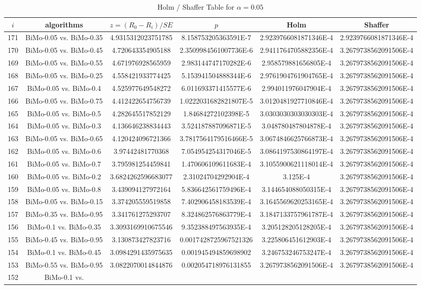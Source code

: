 \documentclass[a4paper,10pt]{article}
\begin{document}
\begin{landscape}
\begin{table}[!htp]
\centering\tiny
\caption{Holm / Shaffer Table for $\alpha=0.05$}
\begin{tabular}{cccccc}
$i$&algorithms&$z=(R_0 - R_i)/SE$&$p$&Holm&Shaffer\\
\hline
171&BiMo-0.05 vs. BiMo-0.35&4.9315312023751785&8.158753205363591E-7&2.9239766081871346E-4&2.9239766081871346E-4\\170&BiMo-0.05 vs. BiMo-0.45&4.720643354905188&2.3509984561007736E-6&2.9411764705882356E-4&3.2679738562091506E-4\\169&BiMo-0.05 vs. BiMo-0.55&4.671976928565959&2.983144747170282E-6&2.958579881656805E-4&3.2679738562091506E-4\\168&BiMo-0.05 vs. BiMo-0.25&4.558421933774425&5.153941504888344E-6&2.9761904761904765E-4&3.2679738562091506E-4\\167&BiMo-0.05 vs. BiMo-0.4&4.525977649548272&6.011693371415577E-6&2.994011976047904E-4&3.2679738562091506E-4\\166&BiMo-0.05 vs. BiMo-0.75&4.412422654756739&1.0222031682821807E-5&3.0120481927710846E-4&3.2679738562091506E-4\\165&BiMo-0.05 vs. BiMo-0.5&4.282645517852129&1.84684272102398E-5&3.0303030303030303E-4&3.2679738562091506E-4\\164&BiMo-0.05 vs. BiMo-0.3&4.136646238834443&3.524187887096871E-5&3.048780487804878E-4&3.2679738562091506E-4\\163&BiMo-0.05 vs. BiMo-0.65&4.120424096721366&3.7817564179516466E-5&3.0674846625766873E-4&3.2679738562091506E-4\\162&BiMo-0.05 vs. BiMo-0.6&3.97442481770368&7.054954254317046E-5&3.0864197530864197E-4&3.2679738562091506E-4\\161&BiMo-0.05 vs. BiMo-0.7&3.795981254459841&1.470606109611683E-4&3.1055900621118014E-4&3.2679738562091506E-4\\160&BiMo-0.05 vs. BiMo-0.2&3.6824262596683077&2.31024704292904E-4&3.125E-4&3.2679738562091506E-4\\159&BiMo-0.05 vs. BiMo-0.8&3.439094127972164&5.836642561759496E-4&3.144654088050315E-4&3.2679738562091506E-4\\158&BiMo-0.05 vs. BiMo-0.15&3.374205559519858&7.402906458183539E-4&3.1645569620253165E-4&3.2679738562091506E-4\\157&BiMo-0.35 vs. BiMo-0.95&3.341761275293707&8.324862576863779E-4&3.1847133757961787E-4&3.2679738562091506E-4\\156&BiMo-0.1 vs. BiMo-0.35&3.3093169910675546&9.352388497563935E-4&3.205128205128205E-4&3.2679738562091506E-4\\155&BiMo-0.45 vs. BiMo-0.95&3.130873427823716&0.0017428725967521326&3.225806451612903E-4&3.2679738562091506E-4\\154&BiMo-0.1 vs. BiMo-0.45&3.0984291435975635&0.001945494859698902&3.246753246753247E-4&3.2679738562091506E-4\\153&BiMo-0.55 vs. BiMo-0.95&3.0822070014844876&0.002054718976131855&3.2679738562091506E-4&3.2679738562091506E-4\\152&BiMo-0.1 vs. 
\end{tabular}
\end{table}
\end{landscape}
\end{document}
